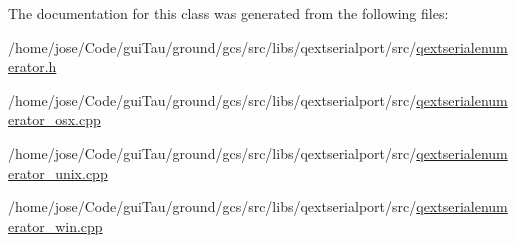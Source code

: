 The documentation for this class was generated from the following files\-:\begin{DoxyCompactItemize}
\item 
/home/jose/\-Code/gui\-Tau/ground/gcs/src/libs/qextserialport/src/\hyperlink{qextserialenumerator_8h}{qextserialenumerator.\-h}\item 
/home/jose/\-Code/gui\-Tau/ground/gcs/src/libs/qextserialport/src/\hyperlink{qextserialenumerator__osx_8cpp}{qextserialenumerator\-\_\-osx.\-cpp}\item 
/home/jose/\-Code/gui\-Tau/ground/gcs/src/libs/qextserialport/src/\hyperlink{qextserialenumerator__unix_8cpp}{qextserialenumerator\-\_\-unix.\-cpp}\item 
/home/jose/\-Code/gui\-Tau/ground/gcs/src/libs/qextserialport/src/\hyperlink{qextserialenumerator__win_8cpp}{qextserialenumerator\-\_\-win.\-cpp}\end{DoxyCompactItemize}
